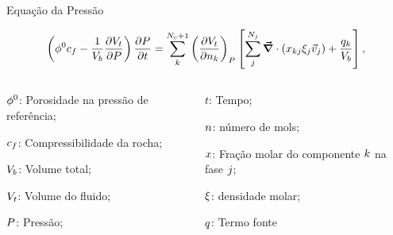 \documentclass[professionalfont]{beamer}
\begin{document}
\begin{frame}{Equação da Pressão}

    \begin{equation}
        \label{eq:modelo_mat.7}
        \left( \phi^{0} c_{f} - \dfrac{1}{V_{b}} \frac{\partial V_{t}}{\partial P} \right) \frac{\partial P}{\partial t} = \sum_{k}^{N_{c} + 1} \left( \frac{\partial V_{t}}{\partial n_{k}}  \right)_{P} \left[ \sum_{j}^{N_{j}} \mbox{\boldmath$ \vec{\nabla} $} \cdot \left(x_{k j} \xi_{j} \vec{v}_{j} \right) + \dfrac{q_{k}}{V_{b}}\right], 
    \end{equation}

    \begin{columns}
        \footnotesize
        \begin{column}{0.5\textwidth}
            \begin{description}
                \item $\phi^{0}$: Porosidade na pressão de referência;
                \item $c_{f}$: Compressibilidade da rocha;
                \item $V_{b}$: Volume total;
                \item $V_{t}$: Volume do fluido;
                \item $P$: Pressão; 
            \end{description}
        \end{column}
        \begin{column}{0.5\textwidth}
            \begin{description}
                \item $t$: Tempo;
                \item $n$: número de mols;
                \item $x$: Fração molar do componente $k$ na fase $j$;
                \item $\xi$: densidade molar;
                \item $q$: Termo fonte 
            \end{description}
            
        \end{column}
    \end{columns}

    
\end{frame}
\end{document}

